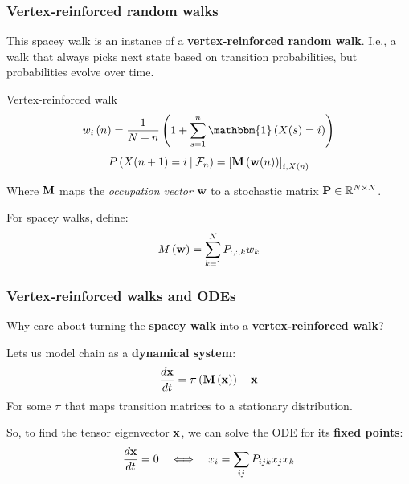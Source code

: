 \documentclass{beamer}
\begin{document}
\begin{frame}
  \frametitle{Vertex-reinforced random walks}
  This spacey walk is an instance of a \textbf{vertex-reinforced random walk}.  I.e., a walk that always picks next state based on transition probabilities, but probabilities evolve over time.

  \begin{block}{Vertex-reinforced walk}
    \begin{equation*}
      w_i\left(n\right) = \frac{1}{N+n}\left(1 + \sum_{s=1}^n \mathbbm{1}\left(X(s)=i\right) \right)
    \end{equation*}
    \begin{equation*}
      P\left(X(n+1) = i \:|\: \mathcal{F}_n\right) = \left[{\bf M} \left({\bf w}(n)\right)\right]_{i,X\left(n\right)}
    \end{equation*}

    Where ${\bf M}$ maps the \textit{occupation vector} ${\bf w}$ to a stochastic matrix ${\bf P}\in\mathbb{R}^{N\times N}$.
  \end{block}

  For spacey walks, define:
  \[ M\left({\bf w}\right) = \sum_{k=1}^N P_{:,:,k} w_k \]
\end{frame}


\begin{frame}
  \frametitle{Vertex-reinforced walks and ODEs}
  Why care about turning the \textbf{spacey walk} into a \textbf{vertex-reinforced walk}?
  \begin{block}{}
    Lets us model chain as a \textbf{dynamical system}:
    \[ \frac{d{\bf x}}{dt} = \pi\left({\bf M}\left({\bf x}\right)\right) - {\bf x} \]
    For some $\pi$ that maps transition matrices to a stationary distribution.
  \end{block}
  So, to find the tensor eigenvector ${\bf x}$, we can solve the ODE for its \textbf{fixed points}:
  \[ \frac{d{\bf x}}{dt} = 0 \quad \Longleftrightarrow \quad x_i = \sum_{ij}P_{ijk}x_jx_k \]
\end{frame}
\end{document}
